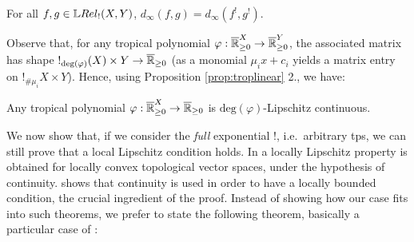 \begin{proposition}
For all $f,g\in \LREL_{!}(X,Y)$, $d_{\infty}( f,g)=d_\infty(f^{!},g^{!})$.%
\end{proposition}



Observe that, for any tropical polynomial $\varphi:\overline{\mathbb{R}}_{\geq 0}^{X}\to \overline{\mathbb{R}}_{\geq 0}^{Y}$, the associated matrix has shape $!_{\mathrm{deg}(\varphi)}(X)\times Y\to \overline{\mathbb{R}}_{\geq 0}$ (as a monomial $\mu_ix+c_{i}$ yields a matrix entry on $!_{\#\mu_i}X\times Y$). Hence, using Proposition \ref{prop:troplinear} 2., we have:
\begin{corollary}\label{prop:polylip}
Any tropical polynomial $\varphi:\overline{\mathbb{R}}_{\geq 0}^{X}\to\overline{\mathbb{R}}_{\geq 0}$ is $\mathrm{deg}(\varphi)$-Lipschitz continuous.
\end{corollary}

We now show that, if we consider the \emph{full} exponential $!$, i.e.~arbitrary tps, we can still prove that a local Lipschitz condition holds. %
In \cite[Theorem 6.4]{Cobzas2017} a locally Lipschitz property is obtained for locally convex topological vector spaces, under the hypothesis of continuity. \cite[Proposition 6.5]{Cobzas2017} shows that continuity is used in order to have a locally bounded condition, the crucial ingredient of the proof.
Instead of showing how our case fits into such theorems, we prefer to state the following theorem, basically a particular case of \cite[Theorem 6.9, Lemma 6.10]{Cobzas2017}:

